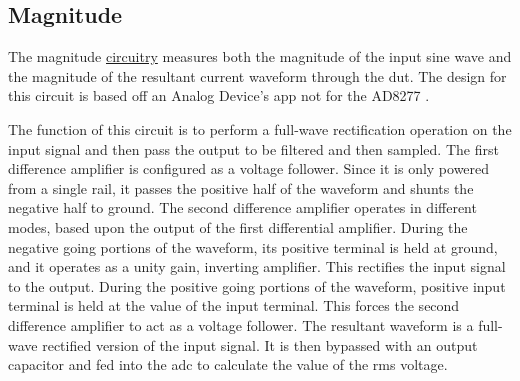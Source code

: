 \subsection{Magnitude}

The magnitude \hyperlink{sch:imph}{circuitry} measures both the magnitude of the input sine wave and the magnitude of the resultant current waveform through the \gls{dut}. The design for this circuit is based off an Analog Device's app not for the AD8277 \cite{absCircuit}.

The function of this circuit is to perform a full-wave rectification operation on the input signal and then pass the output to be filtered and then sampled. The first difference amplifier is configured as a voltage follower. Since it is only powered from a single rail, it passes the positive half of the waveform and shunts the negative half to ground. The second difference amplifier operates in different modes, based upon the output of the first differential amplifier. During the negative going portions of the waveform, its positive terminal is held at ground, and it operates as a unity gain, inverting amplifier. This rectifies the input signal to the output. During the positive going portions of the waveform, positive input terminal is held at the value of the input terminal. This forces the second difference amplifier to act as a voltage follower. The resultant waveform is a full-wave rectified version of the input signal. It is then bypassed with an output capacitor and fed into the \gls{adc} to calculate the value of the rms voltage.


